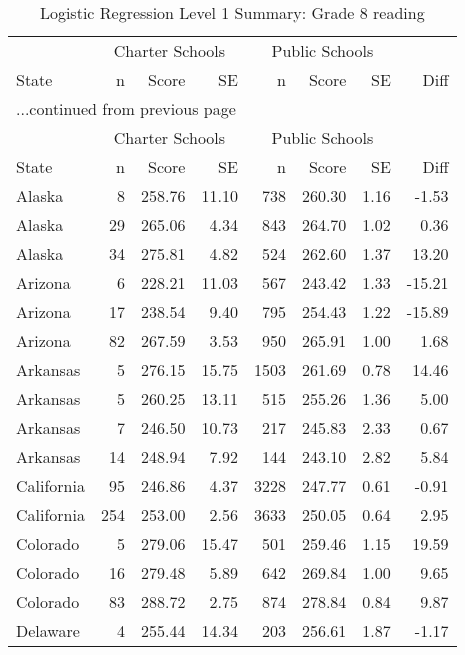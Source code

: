 \begin{longtable}{lrrr@{\extracolsep{10pt}}rrrr}
\caption{Logistic Regression Level 1 Summary: Grade 8 reading} \\ 
  \hline
  & \multicolumn{3}{c}{Charter Schools} & \multicolumn{3}{c}{Public Schools} & \\ \cline{2-4} \cline{5-7} State & n & Score & SE & n & Score & SE & Diff \\ \endfirsthead \multicolumn{8}{l}{{...continued from previous page}}\\ \hline & \multicolumn{3}{c}{Charter Schools} & \multicolumn{3}{c}{Public Schools} & \\ \cline{2-4} \cline{5-7} State & n & Score & SE & n & Score & SE & Diff \\ \hline \endhead \hline \endfoot \endlastfoot \hline
Alaska &   8 & 258.76 & 11.10 & 738 & 260.30 & 1.16 & -1.53 \\ 
  Alaska &  29 & 265.06 & 4.34 & 843 & 264.70 & 1.02 & 0.36 \\ 
  Alaska &  34 & 275.81 & 4.82 & 524 & 262.60 & 1.37 & 13.20 \\ 
  Arizona &   6 & 228.21 & 11.03 & 567 & 243.42 & 1.33 & -15.21 \\ 
  Arizona &  17 & 238.54 & 9.40 & 795 & 254.43 & 1.22 & -15.89 \\ 
  Arizona &  82 & 267.59 & 3.53 & 950 & 265.91 & 1.00 & 1.68 \\ 
  Arkansas &   5 & 276.15 & 15.75 & 1503 & 261.69 & 0.78 & 14.46 \\ 
  Arkansas &   5 & 260.25 & 13.11 & 515 & 255.26 & 1.36 & 5.00 \\ 
  Arkansas &   7 & 246.50 & 10.73 & 217 & 245.83 & 2.33 & 0.67 \\ 
  Arkansas &  14 & 248.94 & 7.92 & 144 & 243.10 & 2.82 & 5.84 \\ 
  California &  95 & 246.86 & 4.37 & 3228 & 247.77 & 0.61 & -0.91 \\ 
  California & 254 & 253.00 & 2.56 & 3633 & 250.05 & 0.64 & 2.95 \\ 
  Colorado &   5 & 279.06 & 15.47 & 501 & 259.46 & 1.15 & 19.59 \\ 
  Colorado &  16 & 279.48 & 5.89 & 642 & 269.84 & 1.00 & 9.65 \\ 
  Colorado &  83 & 288.72 & 2.75 & 874 & 278.84 & 0.84 & 9.87 \\ 
  Delaware &   4 & 255.44 & 14.34 & 203 & 256.61 & 1.87 & -1.17 \\ 

\end{longtable}
